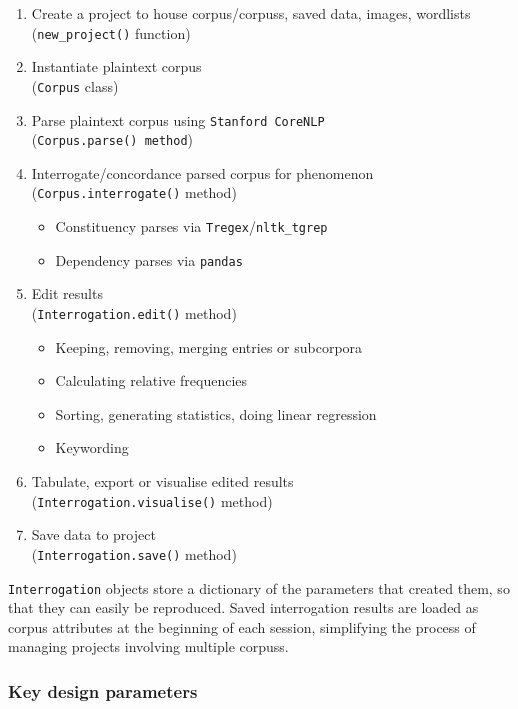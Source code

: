 \begin{enumerate}
    \item Create a project to house corpus\slash \glspl{corpus}, saved data, images, wordlists \\ (\texttt{new\_project()} function)
    \item Instantiate plaintext corpus \\ (\texttt{Corpus} class)
    \item Parse plaintext corpus using \texttt{Stanford CoreNLP} \\ (\texttt{Corpus.parse() method})
    \item Interrogate\slash concordance parsed corpus for  phenomenon \\ (\texttt{Corpus.interrogate()} method)
    \begin{itemize}
        \item Constituency parses via \texttt{Tregex}\slash \texttt{nltk\_tgrep}
        \item Dependency parses via \texttt{pandas}
    \end{itemize}
    \item Edit results \\ (\texttt{Interrogation.edit()} method)
    \begin{itemize}
        \item Keeping, removing, merging entries or subcorpora
        \item Calculating relative frequencies
        \item Sorting, generating statistics, doing linear regression
        \item Keywording
    \end{itemize}
    \item Tabulate, export or visualise edited results \\ (\texttt{Interrogation.visualise()} method)
    \item Save data to project \\ (\texttt{Interrogation.save()} method)
\end{enumerate}
%
\texttt{Interrogation} objects store a dictionary of the parameters that created them, so that they can easily be reproduced. Saved interrogation results are loaded as \gls{corpus} attributes at the beginning of each session, simplifying the process of managing projects involving multiple \glspl{corpus}.

\subsubsection{Key design parameters}

